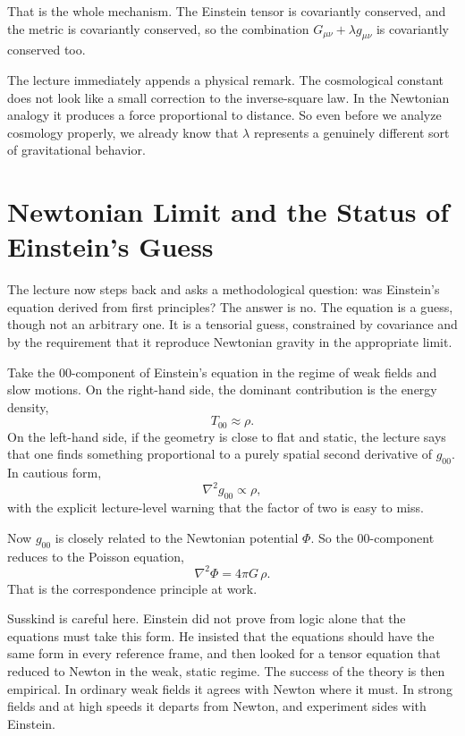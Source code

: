 That is the whole mechanism. The Einstein tensor is covariantly conserved, and the metric is covariantly conserved, so the combination \(G_{\mu\nu}+\lambda g_{\mu\nu}\) is covariantly conserved too.

The lecture immediately appends a physical remark. The cosmological constant does not look like a small correction to the inverse-square law. In the Newtonian analogy it produces a force proportional to distance. So even before we analyze cosmology properly, we already know that \(\lambda\) represents a genuinely different sort of gravitational behavior.

\section{Newtonian Limit and the Status of Einstein's Guess}

The lecture now steps back and asks a methodological question: was Einstein's equation derived from first principles? The answer is no. The equation is a guess, though not an arbitrary one. It is a tensorial guess, constrained by covariance and by the requirement that it reproduce Newtonian gravity in the appropriate limit.

Take the \(00\)-component of Einstein's equation in the regime of weak fields and slow motions. On the right-hand side, the dominant contribution is the energy density,
\begin{equation}
T_{00}\approx \rho.
\end{equation}
On the left-hand side, if the geometry is close to flat and static, the lecture says that one finds something proportional to a purely spatial second derivative of \(g_{00}\). In cautious form,
\begin{equation}
\nabla^2 g_{00}\propto \rho,
\end{equation}
with the explicit lecture-level warning that the factor of two is easy to miss.

Now \(g_{00}\) is closely related to the Newtonian potential \(\Phi\). So the \(00\)-component reduces to the Poisson equation,
\begin{equation}
\nabla^2\Phi=4\pi G\,\rho.
\end{equation}
That is the correspondence principle at work.

Susskind is careful here. Einstein did not prove from logic alone that the equations must take this form. He insisted that the equations should have the same form in every reference frame, and then looked for a tensor equation that reduced to Newton in the weak, static regime. The success of the theory is then empirical. In ordinary weak fields it agrees with Newton where it must. In strong fields and at high speeds it departs from Newton, and experiment sides with Einstein.

